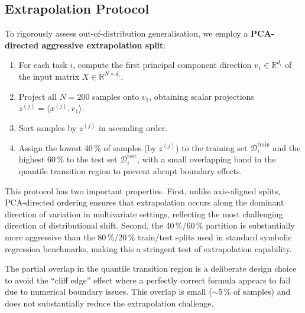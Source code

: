 
\subsection{Extrapolation Protocol}\label{subsec:extrapolation-protocol}
\label{sec:split}

To rigorously assess out-of-distribution generalisation, we employ a
\textbf{PCA-directed aggressive extrapolation split}:

\begin{enumerate}[leftmargin=2em,label=\arabic*.]
  \item For each task $i$, compute the first principal component direction
    $v_1 \in \mathbb{R}^{d_i}$ of the input matrix $X \in \mathbb{R}^{N \times d_i}$.
  \item Project all $N=200$ samples onto $v_1$, obtaining scalar projections
    $z^{(j)} = \langle x^{(j)}, v_1 \rangle$.
  \item Sort samples by $z^{(j)}$ in ascending order.
  \item Assign the lowest 40\,\% of samples (by $z^{(j)}$) to the training set
    $\mathcal{D}^{\mathrm{train}}_i$ and the highest 60\,\% to the test set
    $\mathcal{D}^{\mathrm{test}}_i$, with a small overlapping band in the
    quantile transition region to prevent abrupt boundary effects.
\end{enumerate}

This protocol has two important properties.  First, unlike axis-aligned splits,
PCA-directed ordering ensures that extrapolation occurs along the dominant
direction of variation in multivariate settings, reflecting the most
challenging direction of distributional shift.  Second, the 40\,\%/60\,\%
partition is substantially more aggressive than the 80\,\%/20\,\% train/test
splits used in standard symbolic regression benchmarks, making this a stringent
test of extrapolation capability.

\begin{remark}
The partial overlap in the quantile transition region is a deliberate design choice
to avoid the ``cliff edge'' effect where a perfectly correct formula appears to
fail due to numerical boundary issues.  This overlap is small ($\sim$5\,\% of
samples) and does not substantially reduce the extrapolation challenge.
\end{remark}

